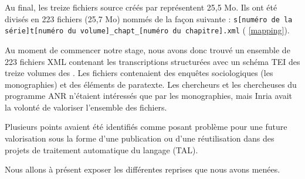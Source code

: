 Au final, les treize fichiers source créés par \lse{} représentent 25,5 Mo. Ils ont été divisés en 223 fichiers (25,7 Mo) nommés de la façon suivante : \texttt{s[numéro de la série]t[numéro du volume]\_chapt\_[numéro du chapitre].xml} (\ann{} \ref{mapping}).

\clearpage


Au moment de commencer notre stage, nous avons donc trouvé un ensemble de 223 fichiers XML contenant les transcriptions structurées avec un schéma TEI des treize volumes des \odm. Les fichiers contenaient des enquêtes sociologiques (les monographies) et des éléments de paratexte. Les chercheurs et les chercheuses du programme ANR \timeus{} n'étaient intéressés que par les monographies, mais Inria avait la volonté de valoriser l'ensemble des fichiers.

Plusieurs points avaient été identifiés comme posant problème pour une future valorisation sous la forme d'une publication ou d'une réutilisation dans des projets de traitement automatique du langage (TAL).

Nous allons à présent exposer les différentes reprises que nous avons menées.

\newpage
\thispagestyle{empty}
\mbox{}
\newpage